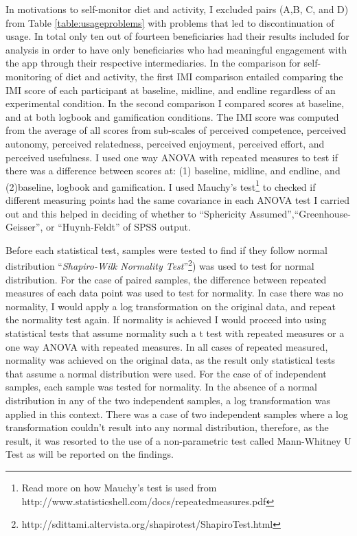 In motivations to self-monitor diet and activity, I excluded pairs (A,B, C, and D) from Table \ref{table:usageproblems} with problems that led to discontinuation of usage. In total only ten out of fourteen beneficiaries had their results included for analysis in order to have only beneficiaries who had meaningful engagement with the app through their respective intermediaries. In the comparison for self-monitoring of diet and activity, the first IMI comparison  entailed comparing the IMI score of each participant at baseline, midline, and endline regardless of an experimental condition. In the second comparison I compared scores at baseline, and at both logbook and gamification conditions. The IMI score was computed from the average of all scores from sub-scales of perceived competence, perceived autonomy, perceived relatedness, perceived enjoyment, perceived effort,  and perceived usefulness. I  used one way ANOVA with repeated measures to test if there was a difference  between scores at: (1) baseline, midline, and endline, and (2)baseline, logbook and gamification. I used Mauchy's test\footnote{Read more on how Mauchy's test is used from http://www.statisticshell.com/docs/repeatedmeasures.pdf} to checked if different measuring points had the same covariance in each ANOVA test I carried out and this helped in deciding of whether to ``Sphericity Assumed'',``Greenhouse-Geisser'', or ``Huynh-Feldt'' of SPSS output.

Before each statistical test, samples were tested to find if they follow normal distribution ``\emph{Shapiro-Wilk Normality Test}''\footnote{http://sdittami.altervista.org/shapirotest/ShapiroTest.html}) was used to test for normal distribution. For the case of paired samples, the difference between repeated measures of each data point was used to test for normality. In case there was no normality, I would apply a log transformation on the original data, and repeat the normality test again. If normality is achieved I would proceed into using statistical tests that assume normality such a t test with repeated measures or a one way ANOVA with repeated measures. In all cases of repeated measured, normality was achieved on the original data, as the result only statistical tests that assume a  normal distribution were used.  For the case of of independent samples, each sample was tested for normality. In the absence of a normal distribution in any of the two independent samples, a log transformation was applied in this context. There was a case of two independent samples where a log transformation couldn't result into any normal distribution, therefore, as the result, it was resorted to the use of a non-parametric test called Mann-Whitney U Test as will be reported on the findings. 
 
